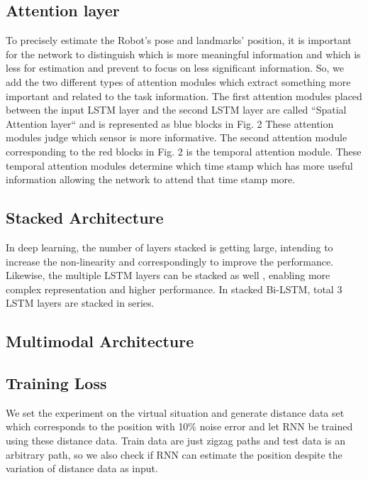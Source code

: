 \documentclass[letterpaper, 10 pt, conference]{ieeeconf}  %
\begin{document}
\subsection{Attention layer}

To precisely estimate the Robot’s pose and landmarks’ position, it is important for the network to distinguish which is more meaningful information and which is less for estimation and prevent to focus on less significant information. So, we add the two different types of attention modules \cite{luong2015effective} which extract something more important and related to the task information. The first attention modules placed between the input LSTM layer and the second LSTM layer are called “Spatial Attention layer“ and is represented as blue blocks in Fig. 2 These attention modules judge which sensor is more informative. The second attention module corresponding to the red blocks in Fig. 2 is the temporal attention module. These temporal attention modules determine which time stamp which has more useful information allowing the network to attend that time stamp more.  

\subsection{Stacked Architecture}

In deep learning, the number of layers stacked is getting large, intending to increase the non-linearity and correspondingly to improve the performance. Likewise, the multiple LSTM layers can be stacked as well \cite{dyer2015transition}, enabling more complex representation and higher performance. In stacked Bi-LSTM, total 3 LSTM layers are stacked in series. 

\subsection{Multimodal Architecture}

\subsection{Training Loss}

We set the experiment on the virtual situation and generate distance data set which corresponds to the position with 10\% noise error and let RNN be trained using these distance data. Train data are just zigzag paths and test data is an arbitrary path, so we also check if RNN can estimate the position despite the variation of distance data as input.
\end{document}
